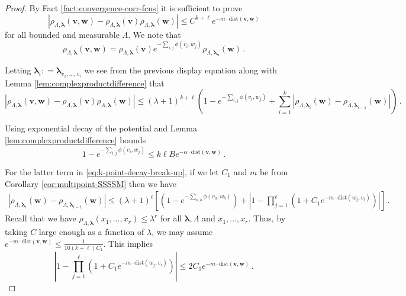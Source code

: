\documentclass[10pt]{amsart}
\theoremstyle{definition}
\theoremstyle{remark}
\newcommand{\blambda}{{\boldsymbol{\lambda}}}
\newcommand{\dist}{\mathrm{dist}}
\begin{document}
	\begin{proof}
		By Fact \ref{fact:convergence-corr-fcns} it is sufficient to prove \begin{equation}\label{eq:corr-fcns-need}
			\left|\rho_{\Lambda,\blambda}(\mathbf{v},\mathbf{w}) - \rho_{\Lambda,\blambda}(\mathbf{v})\rho_{\Lambda,\blambda}(\mathbf{w}) \right| \leq C^{k + \ell} e^{-m \cdot\dist(\mathbf{v},\mathbf{w})}
		\end{equation}
		for all bounded and measurable $\Lambda$.   We note that $$\rho_{\Lambda,\blambda}(\mathbf{v},\mathbf{w}) = \rho_{\Lambda,\blambda}(\mathbf{v}) e^{-\sum_{i,j} \phi(v_i,w_j)} \rho_{\Lambda,\blambda_{\mathbf{v}}}(\mathbf{w})\,.$$
		
		Letting  $\blambda_i: = \blambda_{v_1,\ldots,v_i}$ we see from the previous display equation along with Lemma \ref{lem:complexproductdifference} that \begin{equation}\label{eq:k-point-decay-break-up}
			\left|\rho_{\Lambda,\blambda}(\mathbf{v},\mathbf{w}) - \rho_{\Lambda,\blambda}(\mathbf{v})\rho_{\Lambda,\blambda}(\mathbf{w}) \right| \leq \left(\lambda+1\right)^{k +\ell}\left( 1 - e^{-\sum_{i,j} \phi(v_i,w_j)} + \sum_{i = 1}^k\left| \rho_{\Lambda,\blambda_i}(\mathbf{w}) - \rho_{\Lambda,\blambda_{i-1}}(\mathbf{w}) \right|\right)\,. 
		\end{equation}
		
		Using exponential decay of the potential and Lemma \ref{lem:complexproductdifference} bounds \begin{equation}\label{eq:k-point-potential-decay}
			1 - e^{-\sum_{i,j} \phi(v_i,w_j)} \leq k\ell B e^{- \alpha\cdot\dist(\mathbf{v},\mathbf{w})} \,.
		\end{equation}
		
		For the latter term in \eqref{eq:k-point-decay-break-up}, if we let $C_1$ and $m$ be from Corollary \ref{cor:multipoint-SSSSM} then we have \begin{align}\label{eq:one-point-difference}
			\left|\rho_{\Lambda,\blambda_i}(\mathbf{w}) - \rho_{\Lambda,\blambda_{i-1}}(\mathbf{w}) \right| \leq (\lambda+1)^\ell\left[ \left(1 - e^{-\sum_{a,b} \phi(v_a,w_b) } \right) + \left|1 -  \prod_{j = 1}^\ell\left(1 + C_1 e^{-m \cdot\dist(w_j,v_i)} \right)  \right| \right] \,.
		\end{align}
		Recall that we have $\rho_{\Lambda,\blambda}(x_1,\ldots,x_r) \leq \lambda^r$ for all $\blambda,\Lambda$ and $x_1,\ldots,x_r$.  Thus, by taking $C$ large enough as a function of $\lambda$, we may assume $e^{-m \cdot\dist(\mathbf{v},\mathbf{w})} \leq \frac{1}{10(k + \ell) C_1}.$  This implies \begin{equation*}
			\left|1 -  \prod_{j = 1}^\ell\left(1 + C_1 e^{-m \cdot\dist(w_j,v_i)} \right)  \right| \leq 2 C_1 e^{-m \cdot\dist(\mathbf{v},\mathbf{w})} \,.
		\end{equation*}
		

\end{proof}
\end{document}
